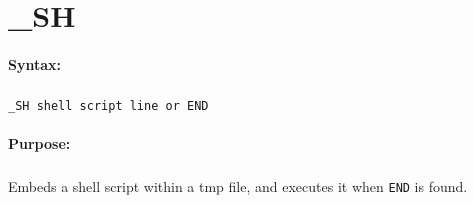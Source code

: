 
\newpage
\section{\_SH}
\label{cmd:_SH}

\paragraph{Syntax:}
\subparagraph{}
\texttt{\_SH shell script line or END}

\paragraph{Purpose:}
\subparagraph{}
Embeds a shell script within a tmp file, and executes
it when \texttt{END} is found.

